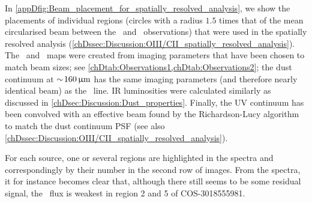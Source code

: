 In \cref{appDfig:Beam_placement_for_spatially_resolved_analysis}, we show the placements of individual regions (circles with a radius $1.5$ times that of the mean circularised beam between the \CII\ and \OIIIf\ observations) that were used in the spatially resolved analysis (\cref{chDssec:Discussion:OIII/CII_spatially_resolved_analysis}). The \OIIILam\ and \CIILam\ maps were created from imaging parameters that have been chosen to match beam sizes; see \cref{chDtab:Observations1,chDtab:Observations2}; the dust continuum at $\sim \! 160 \, \mathrm{\upmu m}$ has the same imaging parameters (and therefore nearly identical beam) as the \CII\ line. IR luminosities were calculated similarly as discussed in \cref{chDsec:Discussion:Dust_properties}. Finally, the UV continuum has been convolved with an effective beam found by the Richardson-Lucy algorithm to match the dust continuum PSF (see also \cref{chDssec:Discussion:OIII/CII_spatially_resolved_analysis}).

For each source, one or several regions are highlighted in the spectra and correspondingly by their number in the second row of images. From the spectra, it for instance becomes clear that, although there still seems to be some residual signal, the \OIIIf\ flux is weakest in region 2 and 5 of COS-3018555981.